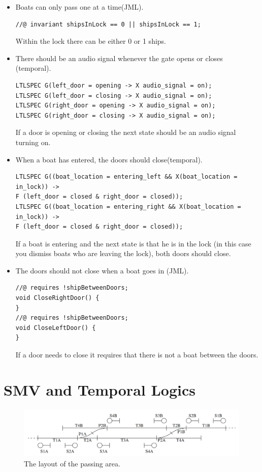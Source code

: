 \documentclass[a4paper]{article}
\begin{document}
\begin{itemize}
		\item Boats can only pass one at a time(JML).
		\begin{lstlisting}
//@ invariant shipsInLock == 0 || shipsInLock == 1;
		\end{lstlisting}
		Within the lock there can be either 0 or 1 ships.
		
		\item There should be an audio signal whenever the gate opens or closes (temporal).
		\begin{lstlisting}
LTLSPEC G(left_door = opening -> X audio_signal = on);
LTLSPEC G(left_door = closing -> X audio_signal = on);
LTLSPEC G(right_door = opening -> X audio_signal = on);
LTLSPEC G(right_door = closing -> X audio_signal = on);
		\end{lstlisting}
		If a door is opening or closing the next state should be an audio signal turning on.
		
		\item When a boat has entered, the doors should close(temporal).
		\begin{lstlisting}
LTLSPEC G((boat_location = entering_left && X(boat_location = in_lock)) ->
F (left_door = closed & right_door = closed));
LTLSPEC G((boat_location = entering_right && X(boat_location = in_lock)) ->
F (left_door = closed & right_door = closed));
		\end{lstlisting}
		If a boat is entering and the next state is that he is in the lock (in this case you dismiss boats who are leaving the lock), both doors should close.
		
		\item The doors should not close when a boat goes in (JML).
		\begin{lstlisting}
//@ requires !shipBetweenDoors;
void CloseRightDoor() {
}
//@ requires !shipBetweenDoors;
void CloseLeftDoor() {
}
		\end{lstlisting}
		If a door needs to close it requires that there is not a boat between the doors.
	\end{itemize}
	
	\section{SMV and Temporal Logics}
	\begin{figure}[h]
		\centering
		\includegraphics[width=\textwidth]{switches.PNG}
		\caption{The layout of the passing area.}
	\end{figure}
	
\end{document}
